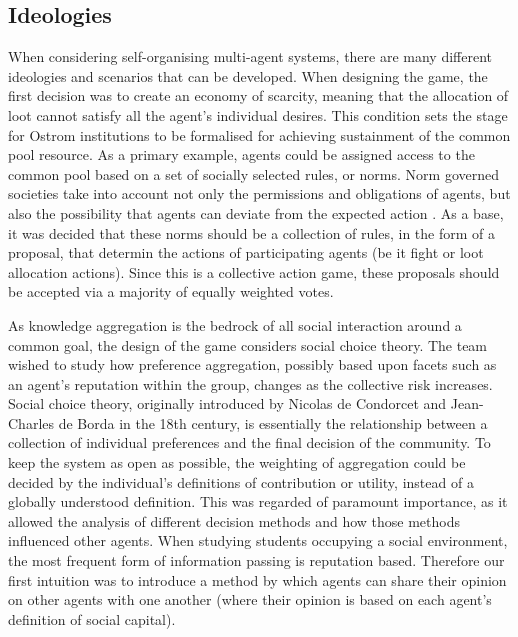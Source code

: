 \subsection{Ideologies}\label{sec: ideologies}

When considering self-organising multi-agent systems, there are many different ideologies and scenarios that can be developed. When designing the game, the first decision was to create an economy of scarcity, meaning that the allocation of loot cannot satisfy all the agent's individual desires. This condition sets the stage for Ostrom institutions to be formalised for achieving sustainment of the common pool resource. As a primary example, agents could be assigned access to the common pool based on a set of socially selected rules, or norms. Norm governed societies take into account not only the permissions and obligations of agents, but also the possibility that agents can deviate from the expected action \cite{pitt2009}. As a base, it was decided that these norms should be a collection of rules, in the form of a proposal, that determin the actions of participating agents (be it fight or loot allocation actions). Since this is a collective action game, these proposals should be accepted via a majority of equally weighted votes. 

As knowledge aggregation is the bedrock of all social interaction around a common goal, the design of the game considers social choice theory. The team wished to study how preference aggregation, possibly based upon facets such as an agent's reputation within the group, changes as the collective risk increases. Social choice theory, originally introduced by Nicolas de Condorcet and Jean-Charles de Borda in the 18th century, is essentially the relationship between a collection of individual preferences and the final decision of the community. To keep the system as open as possible, the weighting of aggregation could be decided by the individual's definitions of contribution or utility, instead of a globally understood definition. This was regarded of paramount importance, as it allowed the analysis of different decision methods and how those methods influenced other agents. When studying students occupying a social environment, the most frequent form of information passing is reputation based. Therefore our first intuition was to introduce a method by which agents can share their opinion on other agents with one another (where their opinion is based on each agent's definition of social capital).  

